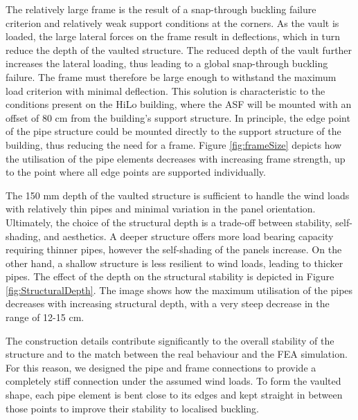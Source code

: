 The relatively large frame is the result of a snap-through buckling failure criterion and relatively weak support conditions at the corners. As the vault is loaded, the large lateral forces on the frame result in deflections, which in turn reduce the depth of the vaulted structure. The reduced depth of the vault further increases the lateral loading, thus leading to a global snap-through buckling failure. The frame must therefore be large enough to withstand the maximum load criterion with minimal deflection. This solution is characteristic to the conditions present on the HiLo building, where the ASF will be mounted with an offset of 80 cm from the building's support structure. In principle, the edge point of the pipe structure could be mounted directly to the support structure of the building, thus reducing the need for a frame. Figure \ref{fig:frameSize} depicts how the utilisation of the pipe elements decreases with increasing frame strength, up to the point where all edge points are supported individually. 

The 150 mm depth of the vaulted structure is sufficient to handle the wind loads with relatively thin pipes and minimal variation in the panel orientation. Ultimately, the choice of the structural depth is a trade-off between stability,  self-shading, and aesthetics. A deeper structure offers more load bearing capacity requiring thinner pipes, however the self-shading of the panels increase. On the other hand, a shallow structure is less resilient to wind loads, leading to thicker pipes. The effect of the depth on the structural stability is depicted in Figure \ref{fig:StructuralDepth}. The image shows how the maximum utilisation of the pipes decreases with increasing structural depth, with a very steep decrease in the range of 12-15 cm. 

The construction details contribute significantly to the overall stability of the structure and to the match between the real behaviour and the FEA simulation. For this reason, we designed the pipe and frame connections to provide a completely stiff connection under the assumed wind loads. To form the vaulted shape, each pipe element is bent close to its edges and kept straight in between those points to improve their stability to localised buckling.


